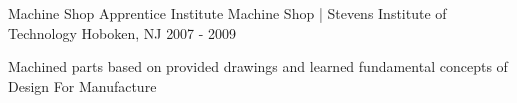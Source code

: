 \begin{cventries}
  \cventry
    {Machine Shop Apprentice} %
    {Institute Machine Shop | Stevens Institute of Technology} %
    {Hoboken, NJ} %
    {2007 - 2009} %
    {%
      \begin{cvitems} %
        \item {Machined parts based on provided drawings and learned fundamental
            concepts of Design For Manufacture}
      \end{cvitems}
    }

\end{cventries}
